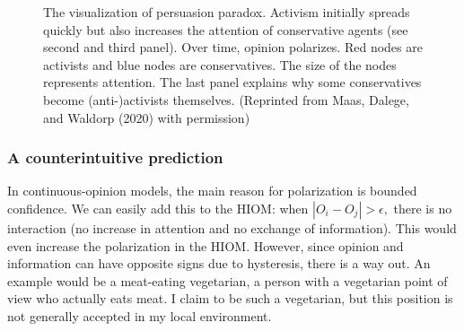 \documentclass[
  a4paper,
  DIV=11,
  numbers=noendperiod,
  oneside]{scrreprt}
\begin{document}
\begin{figure}


\caption{\label{fig-ch7-img11-old-99}The visualization of persuasion
paradox. Activism initially spreads quickly but also increases the
attention of conservative agents (see second and third panel). Over
time, opinion polarizes. Red nodes are activists and blue nodes are
conservatives. The size of the nodes represents attention. The last
panel explains why some conservatives become (anti-)activists
themselves. (Reprinted from Maas, Dalege, and Waldorp (2020) with
permission)}

\end{figure}%

\subsubsection{A counterintuitive
prediction}\label{sec-A-counterintuitive-prediction}

In continuous-opinion models, the main reason for polarization is
bounded confidence. We can easily add this to the HIOM: when
\(\left| O_{i} - O_{j} \right| > \epsilon,\) there is no interaction (no
increase in attention and no exchange of information). This would even
increase the polarization in the HIOM. However, since opinion and
information can have opposite signs due to hysteresis, there is a way
out. An example would be a meat-eating vegetarian, a person with a
vegetarian point of view who actually eats meat. I claim to be such a
vegetarian, but this position is not generally accepted in my local
environment.
\end{document}
